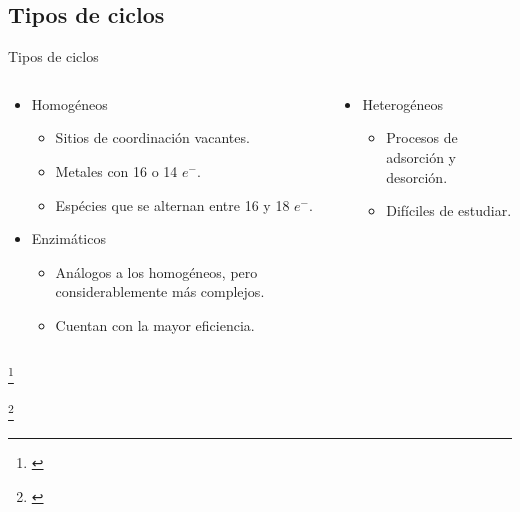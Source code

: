 \documentclass[handout]{beamer}
\newcommand\blfootnote[1]
{%
	\begingroup
	\renewcommand\thefootnote{}\footnote{#1}%
	\addtocounter{footnote}{-1}%
	\endgroup
}
\newcommand{\fcite}[1]{\blfootnote{\cite{#1}}}
\begin{document}
\subsection{Tipos de ciclos}
\begin{frame}{Tipos de ciclos}
    \begin{columns}
        \begin{column}{0.5\textwidth}
            \begin{itemize}
                \item Homogéneos
                \begin{itemize}
                	\item Sitios de coordinaci\'on vacantes.
                	\item Metales con 16 o 14 $e^-$.
                	\item Esp\'ecies que se alternan entre 16 y 18 $e^-$.
                \end{itemize}
                \item Enzim\'aticos
                \begin{itemize}
                	\item An\'alogos a los homog\'eneos, pero considerablemente m\'as complejos.
                	\item Cuentan con la mayor eficiencia.
            	\end{itemize}
            \end{itemize}
        \end{column}
        \begin{column}{0.5\textwidth}
            \begin{itemize}
                \item Heterogéneos
            	\begin{itemize}
            		\item Procesos de adsorción y desorción.
            		\item Difíciles de estudiar.
            	\end{itemize}
            \end{itemize}
        \end{column}
    \end{columns}
	\fcite{astruc2007organometallic}
	\fcite{jens2014fundamental}
\end{frame}
\end{document}
